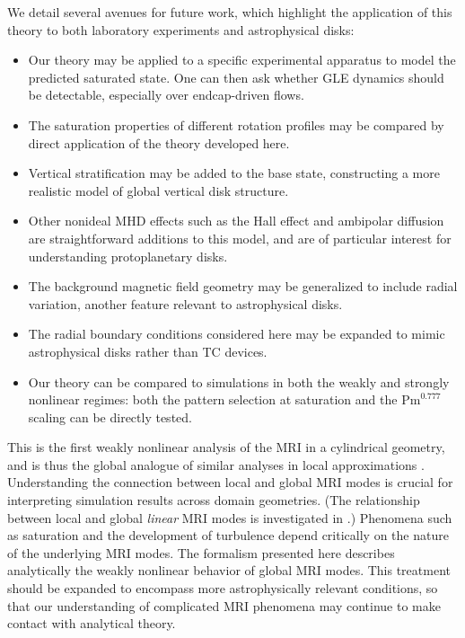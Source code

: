 \documentclass{emulateapj}
\newcommand{\Pm}{\mathrm{Pm}}
\begin{document}
We detail several avenues for future work, which highlight the application of this theory to both laboratory experiments and astrophysical disks:

\begin{itemize}
\item Our theory may be applied to a specific experimental apparatus to model the predicted saturated state. One can then ask whether GLE dynamics should be detectable, especially over endcap-driven flows.
\item The saturation properties of different rotation profiles may be compared by direct application of the theory developed here.
\item Vertical stratification may be added to the base state, constructing a more realistic model of global vertical disk structure. 
\item Other nonideal MHD effects such as the Hall effect and ambipolar diffusion are straightforward additions to this model, and are of particular interest for understanding protoplanetary disks. 
\item The background magnetic field geometry may be generalized to include radial variation, another feature relevant to astrophysical disks.
\item The radial boundary conditions considered here may be expanded to mimic astrophysical disks rather than TC devices.
\item Our theory can be compared to simulations in both the weakly and strongly nonlinear regimes: both the pattern selection at saturation and the $\Pm^{0.777}$ scaling can be directly tested. 
\end{itemize}

This is the first weakly nonlinear analysis of the MRI in a cylindrical geometry, and is thus the global analogue of similar analyses in local approximations \citep{Umurhan:2007hs,Vasil:2015}. Understanding the connection between local and global MRI modes is crucial for interpreting simulation results across domain geometries. (The relationship between local and global \textit{linear} MRI modes is investigated in \citet{Latter:2015}.) Phenomena such as saturation and the development of turbulence depend critically on the nature of the underlying MRI modes. The formalism presented here describes analytically the weakly nonlinear behavior of global MRI modes. This treatment should be expanded to encompass more astrophysically relevant conditions, so that our understanding of complicated MRI phenomena may continue to make contact with analytical theory. 
\end{document}
